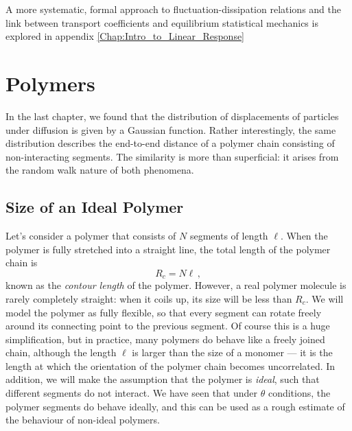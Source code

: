 \documentclass{article}
\theoremstyle{plain}\theoremheaderfont{\normalfont\bfseries}\theorembodyfont{\rmfamily}\theoremseparator{.}\newtheorem*{thm}{Theorem}\newtheorem*{law}{Law}\newtheorem*{pos}{Postulate}
\numberwithin{equation}{section}
\begin{document}
    A more systematic, formal approach to fluctuation-dissipation relations and the link between transport coefficients and equilibrium statistical mechanics is explored in appendix \cref{Chap:Intro_to_Linear_Response}

    \newpage
    \section{Polymers}
    In the last chapter, we found that the distribution of displacements of particles under diffusion is given by a Gaussian function. Rather interestingly, the same distribution describes the end-to-end distance of a polymer chain consisting of non-interacting segments. The similarity is more than superficial: it arises from the random walk nature of both phenomena.
    \subsection{Size of an Ideal Polymer}
    Let's consider a polymer that consists of \(N\) segments of length \(\ell\). When the polymer is fully stretched into a straight line, the total length of the polymer chain is
    \begin{equation}
        R_c=N\ell\,,
    \end{equation}
    known as the \textit{contour length} of the polymer. However, a real polymer molecule is rarely completely straight: when it coils up, its size will be less than \(R_c\). We will model the polymer as fully flexible, so that every segment can rotate freely around its connecting point to the previous segment. Of course this is a huge simplification, but in practice, many polymers do behave like a freely joined chain, although the length \(\ell\) is larger than the size of a monomer --- it is the length at which the orientation of the polymer chain becomes uncorrelated. In addition, we will make the assumption that the polymer is \textit{ideal}, such that different segments do not interact. We have seen that under \(\theta\) conditions, the polymer segments do behave ideally, and this can be used as a rough estimate of the behaviour of non-ideal polymers.
\end{document}
